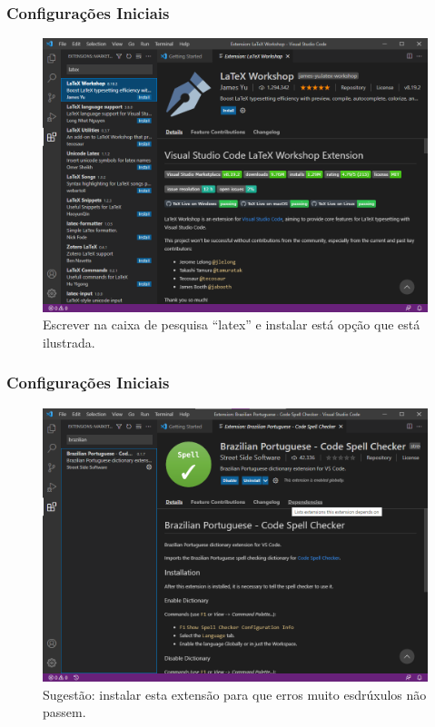 \documentclass{beamer}
\begin{document}
\begin{frame}
    \frametitle{Configurações Iniciais}
\begin{figure}[h]
    \centering
    \caption{Extensão para arquivos \LaTeX.}
    \label{fig:LaTeX_Workshop}
    \includegraphics[width=0.8\textheight]{../images/LaTeX_Workshop.png}
    \caption*{\footnotesize Escrever na caixa de pesquisa ``latex'' e instalar está opção que está ilustrada.}
\end{figure}
\end{frame}

\begin{frame}
    \frametitle{Configurações Iniciais}
\begin{figure}[h]
    \centering
    \caption{Extensão para corrigir os erros de Português (BR).}
    \label{fig:brazilian_portuguese_spell-checker}
    \includegraphics[width=0.8\textheight]{../images/brazilian_portuguese_spell-checker.png}
    \caption*{\footnotesize Sugestão: instalar esta extensão para que erros muito esdrúxulos não passem.}
\end{figure}
\end{frame}
\end{document}
